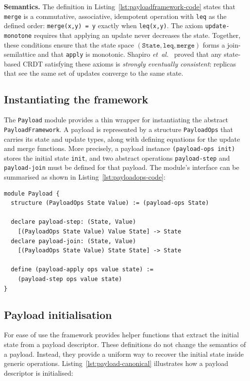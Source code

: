 \noindent\textbf{Semantics.} The definition in Listing~\ref{lst:payloadframework-code} states that \texttt{merge} is a commutative, associative, idempotent operation with \texttt{leq} as the defined order: \texttt{merge(x,y) = y} exactly when \texttt{leq(x,y)}. The axiom \texttt{update-monotone} requires that applying an update never decreases the state. Together, these conditions ensure that the state space $(\texttt{State},\texttt{leq},\texttt{merge})$ forms a join-semilattice and that \texttt{apply} is monotonic. Shapiro \emph{et~al.}~\cite{shapiro2011conflict} proved that any state-based CRDT satisfying these axioms is \emph{strongly eventually consistent}: replicas that see the same set of updates converge to the same state.

\subsection{Instantiating the framework}

The \texttt{Payload} module provides a thin wrapper for instantiating the abstract \texttt{PayloadFramework}. A payload is represented by a structure \texttt{PayloadOps} that carries its state and update types, along with defining equations for the update and merge functions. More precisely, a payload instance \lstinline{(payload-ops init)} stores the initial state \lstinline{init}, and two abstract operations \lstinline{payload-step} and \lstinline{payload-join} must be defined for that payload. The module’s interface can be summarised as shown in Listing~\ref{lst:payloadops-code}:

\begin{lstlisting}[language=Athena,style=athena]
module Payload {
  structure (PayloadOps State Value) := (payload-ops State)

  declare payload-step: (State, Value)
    [(PayloadOps State Value) Value State] -> State
  declare payload-join: (State, Value)
    [(PayloadOps State Value) State State] -> State

  define (payload-apply ops value state) :=
    (payload-step ops value state)
}
\end{lstlisting}

\subsection{Payload initialisation}

For ease of use the framework provides helper functions that extract the initial state from a payload descriptor. These definitions do not change the semantics of a payload. Instead, they provide a uniform way to recover the initial state inside generic operations. Listing~\ref{lst:payload-canonical} illustrates how a payload descriptor is initialised:

